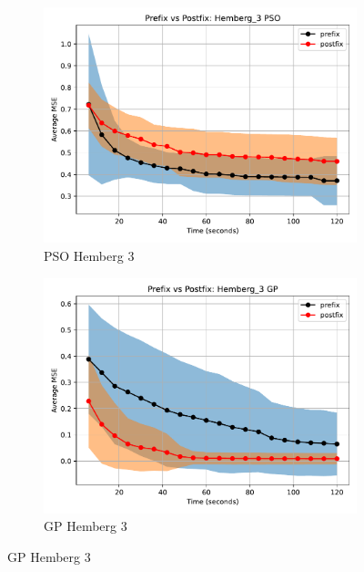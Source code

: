 \documentclass[runningheads]{llncs}
\begin{document}
\begin{figure}
    \vspace{0.5cm}
    
    \begin{subfigure}[b]{0.4\textwidth}
        \includegraphics[width=\linewidth, keepaspectratio]{Hemberg_Benchmarks/PrePostHemberg_3PSO.pdf}
        \caption{PSO Hemberg 3}
        \label{subfig:hemberg_3_PSO}
    \end{subfigure}
    \begin{subfigure}[b]{0.4\textwidth}
        \includegraphics[width=\linewidth, keepaspectratio]{Hemberg_Benchmarks/PrePostHemberg_3GP.pdf}
        \caption{GP Hemberg 3}
        \label{subfig:hemberg_3_GP}
    \end{subfigure}
    

\end{figure}
\end{document}
